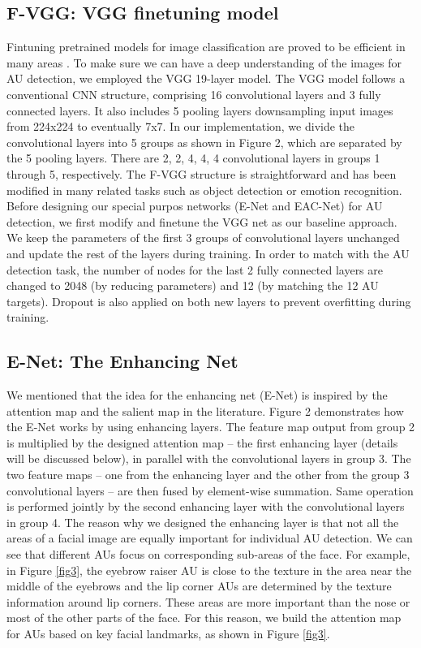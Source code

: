 \documentclass[a4paper, 10pt, conference]{ieeeconf}      %
\begin{document}
\subsection{F-VGG: VGG finetuning model}
Fintuning pretrained models for image classification are proved to be efficient in many areas \cite{p2, p3}. To make sure we can have a deep understanding of the images for AU detection, we employed the VGG 19-layer model. The VGG model follows a conventional CNN structure, comprising 16 convolutional layers and 3 fully connected layers. It also includes 5 pooling layers downsampling input images from 224x224 to eventually 7x7. In our implementation, we divide the convolutional layers into 5 groups as shown in Figure 2, which are separated by the 5 pooling layers. There are 2, 2, 4, 4, 4 convolutional layers in groups 1 through 5, respectively. The F-VGG structure is straightforward and has been modified in many related tasks such as object detection or emotion recognition.  Before designing our special purpos networks (E-Net and EAC-Net) for AU detection, we first modify and finetune the VGG net as our baseline approach. We keep the parameters of the first 3 groups of convolutional layers unchanged and update the rest of the layers during training. In order to match with the AU detection task, the number of nodes for the last 2 fully connected layers are changed to 2048 (by reducing parameters) and 12 (by matching the 12 AU targets). Dropout is also applied on both new layers to prevent overfitting during training.   

\subsection{E-Net: The Enhancing Net}
We mentioned that the idea for the enhancing net (E-Net) is inspired by the attention map and the salient map in the literature. Figure 2 demonstrates how the E-Net works by using enhancing layers. The feature map output from group 2 is multiplied by the designed attention map -- the first enhancing layer (details will be discussed below), in parallel with the convolutional layers in group 3. The two feature maps -- one from the enhancing layer and the other from the group 3 convolutional layers --  are then fused by element-wise summation.  Same operation is performed jointly by the second enhancing layer with the convolutional layers in group 4.  The reason why we designed the enhancing layer is that not all the areas of a facial image are equally important for individual AU detection. We can see that different AUs focus on corresponding sub-areas of the face. For example, in Figure \ref{fig3}, the eyebrow raiser AU is close to the texture in the area near the middle of the eyebrows and the lip corner AUs are determined by the texture information around lip corners. These areas are more important than the nose or most of the other parts of the face. For this reason, we build the attention map for AUs based on key facial landmarks, as shown in Figure \ref{fig3}. 
\end{document}
